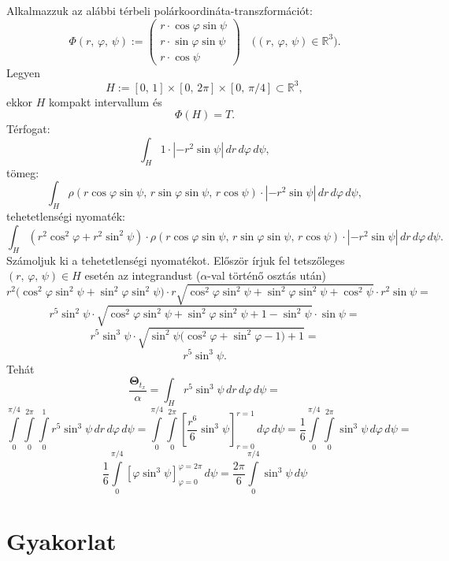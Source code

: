 \documentclass{article}
\newcommand{\R}{\mathbb{R}}
\begin{document}
	Alkalmazzuk az alábbi térbeli polárkoordináta-transzformációt:
	\[
		\Phi(r, \, \varphi, \, \psi) := \begin{pmatrix}
			r \cdot \cos \varphi \sin \psi \\
			r \cdot \sin \varphi \sin \psi \\
			r \cdot \cos \psi
		\end{pmatrix} \quad \big( (r, \, \varphi, \, \psi) \in \R^3\big).
	\]
	Legyen
	\[
		H := [0, \, 1] \times [0, \, 2 \pi] \times [0, \, \pi / 4] \subset \R^3,
	\]
	ekkor $H$ kompakt intervallum és
	\[
		\Phi(H) = T.
	\]
	Térfogat:
	\[
		\int_H 1 \cdot |-r^2 \sin \psi| \, dr \, d\varphi \, d\psi,
	\]
	tömeg:
	\[
		\int_H \rho(r \cos \varphi \sin \psi, \, r \sin \varphi \sin \psi, \, r \cos \psi) \cdot |-r^2 \sin \psi| \, dr \, d\varphi \, d\psi,
	\]
	tehetetlenségi nyomaték:
	\[
		\int_H (r^2 \cos^2\varphi + r^2 \sin^2 \psi) \cdot \rho(r \cos \varphi \sin \psi, \, r \sin \varphi \sin \psi, \, r \cos \psi) \cdot |-r^2 \sin \psi| \, dr \, d\varphi \, d\psi.
	\]
	Számoljuk ki a tehetetlenségi nyomatékot. Először írjuk fel tetszőleges $(r, \, \varphi, \, \psi) \in H$ esetén az integrandust ($\alpha$-val történő osztás után)
	\[
		r^2 \big( \cos^2 \varphi \sin^2 \psi + \sin^2 \varphi \sin^2 \psi \big) \cdot r \sqrt{\cos^2 \varphi \sin^2 \psi + \sin^2 \varphi \sin^2 \psi + \cos^2 \psi} \cdot r^2 \sin \psi =
	\]
	\[
		r^5 \sin^2 \psi \cdot \sqrt{\cos^2 \varphi \sin^2 \psi + \sin^2 \varphi \sin^2 \psi + 1 - \sin^2 \psi} \cdot \sin \psi =
	\]
	\[
		r^5 \sin^3 \psi \cdot \sqrt{ \sin^2 \psi \big( \cos^2 \varphi + \sin^2 \varphi - 1 \big) + 1} =
	\]
	\[
		r^5 \sin^3 \psi.
	\]
	Tehát
	\[
		\frac{\mathbf{\Theta}_{t_x}}{\alpha} = \int_H r^5 \sin^3 \psi \, dr \, d\varphi \, d \psi =
	\]
	\[
		\int\limits_0^{\pi / 4} \int\limits_0^{2 \pi} \int \limits_0^{1} r^5 \sin^3 \psi \, dr \, d\varphi \, d\psi = \int\limits_0^{\pi / 4} \int\limits_0^{2 \pi} \left[ \frac{r^6}{6} \sin^3 \psi \right]_{r=0}^{r=1} \, d\varphi \, d\psi = \frac{1}{6} \int\limits_0^{\pi / 4} \int\limits_0^{2 \pi} \sin^3 \psi \, d\varphi \, d\psi =
	\]
	\[
		\frac{1}{6} \int\limits_0^{\pi / 4} [\varphi \sin^3\psi]_{\varphi=0}^{\varphi=2\pi} \, d\psi = \frac{2 \pi}{6} \int\limits_0^{\pi / 4} \sin^3\psi \, d\psi
	\]

	\newpage
	\section{Gyakorlat}
\end{document}

